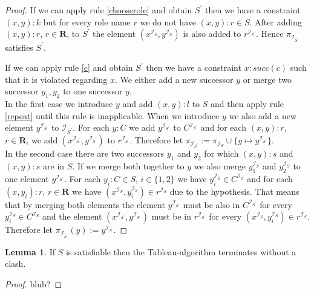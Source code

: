 \documentclass[a4paper,11pt]{scrartcl}
\theoremstyle{break}
\theoremstyle{definition}
\newtheorem{mylem}{Lemma}
\begin{document}
\begin{proof}
If we can apply rule \ref{chooserole} and obtain $S^\prime$ then we have a constraint $(x,y):k$ but for every role name $r$ we do not have $(x,y):r\in S$. After adding $(x,y):r$, $r\in\mathbf{R}$, to $S^\prime$ the element $(x^{\mathcal{I}_{S}},y^{\mathcal{I}_{S}})$ is also added to $r^{\mathcal{I}_{S^\prime}}$. Hence $\pi_{\mathcal{I}_{S^\prime}}$ satisfies $S^\prime$.\par
If we can apply rule \ref{c} and obtain $S^\prime$ then we have a constraint $x:succ(c)$ such that it is violated regarding $x$. We either add a new successor $y$ or merge two successor $y_1, y_2$ to one successor $y$.\\
In the first case we introduce $y$ and add $(x,y):l$ to $S$ and then apply rule \ref{repeat} until this rule is inapplicable. When we introduce $y$ we also add a new element $y^{\mathcal{I}_{S^\prime}}$ to $\mathcal{I}_{S^\prime}$. For each $y:C$ we add $y^{\mathcal{I}_{S^\prime}}$ to $C^{\mathcal{I}_{S^\prime}}$ and for each $(x,y):r$, $r\in\mathbf{R}$, we add $(x^{\mathcal{I}_{S^\prime}},y^{\mathcal{I}_{S^\prime}})$ to $r^{\mathcal{I}_{S^\prime}}$. Therefore let $\pi_{\mathcal{I}_{S^\prime}}:=\pi_{\mathcal{I}_S}\cup \{y\mapsto y^{\mathcal{I}_{S^\prime}}\}$.\\
In the second case there are two successors $y_1$ and $y_2$ for which $(x,y):s$ and $(x,y):s$ are in $S$. If we merge both together to $y$ we also merge $y_1^{\mathcal{I}_S}$ and $y_2^{\mathcal{I}_S}$ to one element $y^{\mathcal{I}_{S^\prime}}$. For each $y_i:C\in S$, $i\in\{1,2\}$ we have $y_i^{\mathcal{I}_S}\in C^{\mathcal{I}_S}$ and for each $(x,y_i):r$, $r\in\mathbf{R}$ we have $(x^{\mathcal{I}_S},y_i^{\mathcal{I}_S})\in r^{\mathcal{I}_S}$ due to the hypothesis. That means that by merging both elements the element $y^{\mathcal{I}_{S^\prime}}$ must be also in $C^{\mathcal{I}_{S^\prime}}$ for every $y_i^{\mathcal{I}_S}\in C^{\mathcal{I}_S}$ and the element $(x^{\mathcal{I}_{S^\prime}},y^{\mathcal{I}_{S^\prime}})$ must be in $r^{\mathcal{I}_{S^\prime}}$ for every $(x^{\mathcal{I}_S},y_i^{\mathcal{I}_S})\in r^{\mathcal{I}_S}$. Therefore let $\pi_{\mathcal{I}_{S^\prime}}(y):=y^{\mathcal{I}_{S^\prime}}$.
\end{proof}
\begin{mylem}
If $S$ is satisfiable then the Tableau-algorithm terminates without a clash.
\end{mylem}
\begin{proof}
blub?
\end{proof}
\normalem


\end{document}
